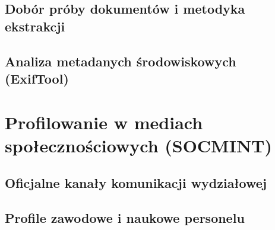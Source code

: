 \subsection{Dobór próby dokumentów i metodyka ekstrakcji}\label{subsec:pozyskiwanie-dokumentow}

\subsection{Analiza metadanych środowiskowych (ExifTool)}\label{subsec:analiza-exiftool}

\section{Profilowanie w mediach społecznościowych (SOCMINT)}\label{sec:socmint-tozsamosci}

\subsection{Oficjalne kanały komunikacji wydziałowej}\label{subsec:oficjalne-social-media}

\subsection{Profile zawodowe i naukowe personelu}\label{subsec:profile-zawodowe}

